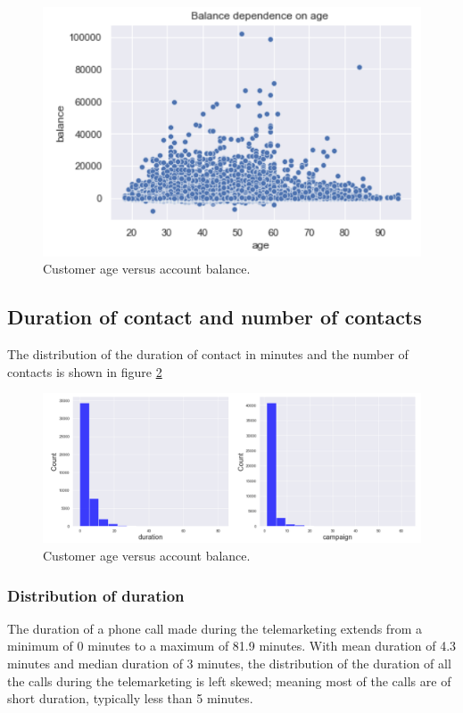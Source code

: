 \begin{figure}[tbh]
\centering
\includegraphics[width = 0.7\hsize]{./resources/img/fig_age_balance_scatter.png}
\caption{Customer age versus account balance.} 
\label{fig:age_balance_scatter}
\end{figure}

\subsection{Duration of contact and number of contacts}
The distribution of the duration of contact in minutes and the number of contacts is shown in figure \ref{fig:duration_campaign_count}

\begin{figure}[tbh]
\centering
\includegraphics[width = 0.8\hsize]{./resources/img/fig_duration_campaign_count.png}
\caption{Customer age versus account balance.} 
\label{fig:duration_campaign_count}
\end{figure}

\subsubsection*{Distribution of duration}
The duration of a phone call made during the telemarketing extends from a minimum of 0 minutes to a maximum of 81.9 minutes. With mean duration of 4.3 minutes and median duration of 3 minutes, the distribution of the duration of all the calls during the telemarketing is left skewed; meaning most of the calls are of short duration, typically less than 5 minutes.

